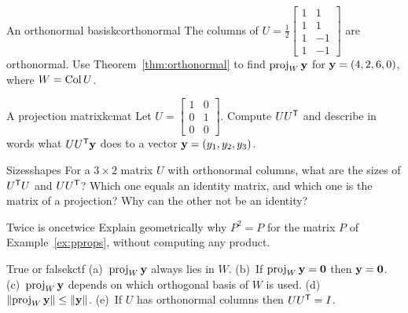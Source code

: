 \documentclass[11pt]{article}
\begin{document}
\begin{kc}{An orthonormal basis}{kcorthonormal}
The columns of $U=\tfrac12\begin{bmatrix}1&1\\1&1\\1&-1\\1&-1\end{bmatrix}$ are orthonormal. Use Theorem~\ref{thm:orthonormal} to find $\operatorname{proj}_W\mathbf{y}$ for $\mathbf{y}=(4,2,6,0)$, where $W=\operatorname{Col} U$.
\end{kc}

\begin{kc}{A projection matrix}{kcmat}
Let $U=\begin{bmatrix}1&0\\0&1\\0&0\end{bmatrix}$. Compute $UU^{\mathsf T}$ and describe in words what $UU^{\mathsf T}\mathbf{y}$ does to a vector $\mathbf{y}=(y_1,y_2,y_3)$.
\end{kc}

\begin{think}{Sizes}{shapes}
For a $3\times2$ matrix $U$ with orthonormal columns, what are the sizes of $U^{\mathsf T} U$ and $UU^{\mathsf T}$? Which one equals an identity matrix, and which one is the matrix of a projection? Why can the other not be an identity?
\end{think}

\begin{think}{Twice is once}{twice}
Explain geometrically why $P^2=P$ for the matrix $P$ of Example~\ref{ex:pprops}, without computing any product.
\end{think}

\begin{kc}{True or false}{kctf}
(a)~$\operatorname{proj}_W\mathbf{y}$ always lies in $W$. (b)~If $\operatorname{proj}_W\mathbf{y}=\mathbf{0}$ then $\mathbf{y}=\mathbf{0}$. (c)~$\operatorname{proj}_W\mathbf{y}$ depends on which orthogonal basis of $W$ is used. (d)~$\lVert\operatorname{proj}_W\mathbf{y}\rVert\le\lVert\mathbf{y}\rVert$. (e)~If $U$ has orthonormal columns then $UU^{\mathsf T}=I$.
\end{kc}

\end{document}
